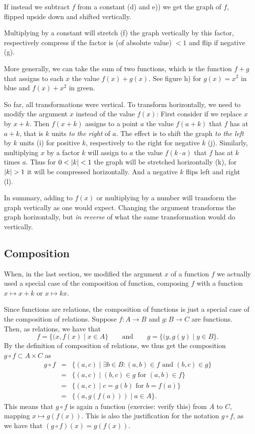 If instead we subtract $f$ from a constant (d) and e)) we get the graph of $f$, flipped
upside down and shifted vertically.

Multiplying by a constant will stretch (f) the graph vertically by this factor, respectively
compress if the factor is (of absolute value) $<1$ and flip if negative (g).
\smallskip

More generally, we can take the sum of two functions, which is the function $f+g$ that
assigns to each $x$ the value $f(x)+g(x)$. See figure h) for $g(x)=x^2$ in blue and
$f(x)+x^2$ in green.
\medskip

So far, all transformations were vertical. To transform horizontally, we need to modify
the argument $x$ instead of the value $f(x)$:
First consider if we replace $x$ by $x+k$. Then $f(x+k)$ assigns to a point $a$ the
value $f(a+k)$ that $f$ has at $a+k$, that is $k$ units {\em to the right} of $a$.
The effect is to shift the
graph {\em to the left} by $k$ units (i) for positive $k$, respectively to the right for
negative $k$ (j).
Similarly, multiplying $x$ by a factor $k$ will assign to $a$ the value $f(k\cdot a)$
that $f$ has at $k$ times $a$. Thus for $0<\left|k\right|<1$ the graph will be stretched
horizontally (k), for $\sz{k}>1$ it will be compressed horizontally. And a negative $k$
flips left and right (l).
\medskip

In summary, adding to $f(x)$ or multiplying by a number will transform the graph
vertically as one would expect. Changing the argument transforms the graph horizontally,
but {\em in reverse} of what the same transformation would do vertically.

\subsection{Composition}
\label{secfunccomposition}

When, in the last section, we modified the argument $x$ of a function $f$ we actually
used a special case of the composition of function, composing $f$ with a function
$x\mapsto x+k$ or $x\mapsto kx$.

Since functions are relations, the composition of functions is just a special case of
the composition of relations. Suppose $f\colon A\to B$ and $g\colon B\to C$ are
functions. Then, as relations, we have that 
\[
f=\{(x,f(x)\mid x\in A\}
\qquad\mbox{and}\qquad
g=\{(y,g(y)\mid y\in B\}.
\]
By the definition of composition of relations, we thus get the composition $g\circ
f\subset A\times C$ as
\begin{eqnarray*}
g\circ f&=&\{(a,c)\mid \exists b\in B:(a,b)\in f \mbox{\ and\ }(b,c)\in g\}\\
&=&\{(a,c)\mid (b,c)\in g \mbox{\ for\ }(a,b)\in f\}\\
&=&\{(a,c)\mid c=g(b) \mbox{\ for\ }b=f(a)\}\\
&=&\{(a,g(f(a)))\mid a\in A\}.
\end{eqnarray*}
This means that $g\circ f$ is again a function (exercise: verify this) from
$A$ to $C$, mapping $x\mapsto g(f(x))$. This is also the justification for the notation
$g\circ f$, as we have that $(g\circ f)(x)=g(f(x))$.
\smallskip

